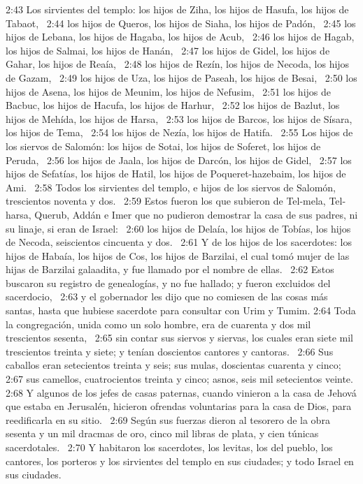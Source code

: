 2:43 Los sirvientes del templo: los hijos de Ziha, los hijos de Hasufa, los hijos de Tabaot,  
2:44 los hijos de Queros, los hijos de Siaha, los hijos de Padón,  
2:45 los hijos de Lebana, los hijos de Hagaba, los hijos de Acub,  
2:46 los hijos de Hagab, los hijos de Salmai, los hijos de Hanán,  
2:47 los hijos de Gidel, los hijos de Gahar, los hijos de Reaía,  
2:48 los hijos de Rezín, los hijos de Necoda, los hijos de Gazam,  
2:49 los hijos de Uza, los hijos de Paseah, los hijos de Besai,  
2:50 los hijos de Asena, los hijos de Meunim, los hijos de Nefusim,  
2:51 los hijos de Bacbuc, los hijos de Hacufa, los hijos de Harhur,  
2:52 los hijos de Bazlut, los hijos de Mehída, los hijos de Harsa,  
2:53 los hijos de Barcos, los hijos de Sísara, los hijos de Tema,  
2:54 los hijos de Nezía, los hijos de Hatifa.  
2:55 Los hijos de los siervos de Salomón: los hijos de Sotai, los hijos de Soferet, los hijos de Peruda,  
2:56 los hijos de Jaala, los hijos de Darcón, los hijos de Gidel,  
2:57 los hijos de Sefatías, los hijos de Hatil, los hijos de Poqueret-hazebaim, los hijos de Ami.  
2:58 Todos los sirvientes del templo, e hijos de los siervos de Salomón, trescientos noventa y dos.  
2:59 Estos fueron los que subieron de Tel-mela, Tel-harsa, Querub, Addán e Imer que no pudieron demostrar la casa de sus padres, ni su linaje, si eran de Israel:  
2:60 los hijos de Delaía, los hijos de Tobías, los hijos de Necoda, seiscientos cincuenta y dos.  
2:61 Y de los hijos de los sacerdotes: los hijos de Habaía, los hijos de Cos, los hijos de Barzilai, el cual tomó mujer de las hijas de Barzilai galaadita, y fue llamado por el nombre de ellas.  
2:62 Estos buscaron su registro de genealogías, y no fue hallado; y fueron excluidos del sacerdocio,  
2:63 y el gobernador les dijo que no comiesen de las cosas más santas, hasta que hubiese sacerdote para consultar con Urim y Tumim. 
2:64 Toda la congregación, unida como un solo hombre, era de cuarenta y dos mil trescientos sesenta,  
2:65 sin contar sus siervos y siervas, los cuales eran siete mil trescientos treinta y siete; y tenían doscientos cantores y cantoras.  
2:66 Sus caballos eran setecientos treinta y seis; sus mulas, doscientas cuarenta y cinco;  
2:67 sus camellos, cuatrocientos treinta y cinco; asnos, seis mil setecientos veinte.  
2:68 Y algunos de los jefes de casas paternas, cuando vinieron a la casa de Jehová que estaba en Jerusalén, hicieron ofrendas voluntarias para la casa de Dios, para reedificarla en su sitio.  
2:69 Según sus fuerzas dieron al tesorero de la obra sesenta y un mil dracmas de oro, cinco mil libras de plata, y cien túnicas sacerdotales.  
2:70 Y habitaron los sacerdotes, los levitas, los del pueblo, los cantores, los porteros y los sirvientes del templo en sus ciudades; y todo Israel en sus ciudades. 
